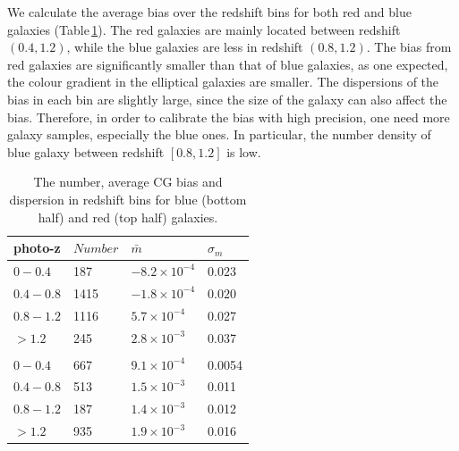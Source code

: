 \documentclass[useAMS,usenatbib]{mn2e}
\newcommand{\be}{\begin{equation}}
\newcommand{\ee}{\end{equation}}
\begin{document}

We calculate the average bias over the redshift bins for both red and
blue galaxies (Table\,\ref{table:calibration}). The red galaxies
are mainly located between redshift $(0.4,1.2)$, while the blue galaxies
are less in redshift $(0.8,1.2)$. The bias from red galaxies are
significantly smaller than that of blue galaxies, as one expected, the
colour gradient in the elliptical galaxies are smaller. The
dispersions of the bias in each bin are slightly large, since the size
of the galaxy can also affect the bias. Therefore, in order to
calibrate the bias with high precision, one need more galaxy samples,
especially the blue ones. In particular, the number density of blue
galaxy between redshift $[0.8,1.2]$ is low.


\begin{center}
\begin{table}
  \begin{tabular}{llll}
    \hline
    photo-z    &$Number$  &$\bar{m}$  &$\sigma_m$ \\
    \hline
    $0-0.4$   &187  &$-8.2\times10^{-4}$  &$0.023$\\
    $0.4-0.8$  &1415 &$-1.8\times10^{-4}$  &$0.020$\\
    $0.8-1.2$  &1116 &$5.7\times10^{-4}$  &0.027\\
    $>1.2$  &245  &$2.8\times10^{-3}$  &0.037\\
    \\
    $0-0.4$  &667  &$9.1\times10^{-4}$  &0.0054\\
    $0.4-0.8$ &513  &$1.5\times10^{-3}$  &0.011\\
    $0.8-1.2$ &187  &$1.4\times10^{-3}$  &0.012\\
    $>1.2$  &935  &$1.9\times10^{-3}$  &0.016\\
    \hline
  \end{tabular}
  \caption{\label{table:calibration}The number, average CG bias and dispersion in redshift bins for blue (bottom half) and red (top half) galaxies. }
\end{table}
\end{center}

\end{document}
